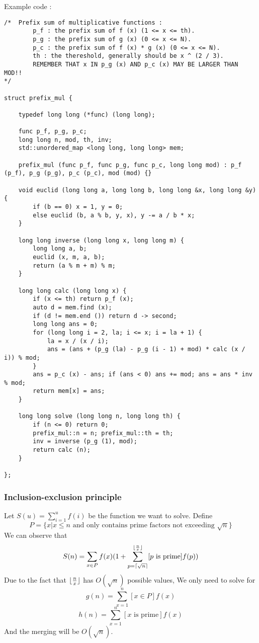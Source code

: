 Example code :

\begin{lstlisting}
/*	Prefix sum of multiplicative functions :
		p_f : the prefix sum of f (x) (1 <= x <= th).
		p_g : the prefix sum of g (x) (0 <= x <= N).
		p_c : the prefix sum of f (x) * g (x) (0 <= x <= N).
		th : the thereshold, generally should be x ^ (2 / 3).
		REMEMBER THAT x IN p_g (x) AND p_c (x) MAY BE LARGER THAN MOD!!
*/

struct prefix_mul {

	typedef long long (*func) (long long);

	func p_f, p_g, p_c;
	long long n, mod, th, inv;
	std::unordered_map <long long, long long> mem;

	prefix_mul (func p_f, func p_g, func p_c, long long mod) : p_f (p_f), p_g (p_g), p_c (p_c), mod (mod) {}

	void euclid (long long a, long long b, long long &x, long long &y) {
		if (b == 0) x = 1, y = 0;
		else euclid (b, a % b, y, x), y -= a / b * x;
	}

	long long inverse (long long x, long long m) {
		long long a, b;
		euclid (x, m, a, b);
		return (a % m + m) % m;
	}

	long long calc (long long x) {
		if (x <= th) return p_f (x);
		auto d = mem.find (x);
		if (d != mem.end ()) return d -> second;
		long long ans = 0;
		for (long long i = 2, la; i <= x; i = la + 1) {
			la = x / (x / i);
			ans = (ans + (p_g (la) - p_g (i - 1) + mod) * calc (x / i)) % mod;
		}
		ans = p_c (x) - ans; if (ans < 0) ans += mod; ans = ans * inv % mod;
		return mem[x] = ans;
	}

	long long solve (long long n, long long th) {
		if (n <= 0) return 0;
		prefix_mul::n = n; prefix_mul::th = th;
		inv = inverse (p_g (1), mod);
		return calc (n); 
	}

};
\end{lstlisting}

\subsubsection{Inclusion-exclusion principle}

Let $S(u)=\sum_{i=1}^uf(i)$ be the function we want to solve. Define
$$P = \{x|x \leq n \text{ and only contains prime factors not exceeding } \sqrt{n}\}$$
We can observe that $$S(n)=\sum_{x \in P} f(x)(1 + \sum_{p=\lceil\sqrt{n}\rceil}^{\lfloor\frac{n}{x}\rfloor}[p \text{ is prime}]f(p))$$
Due to the fact that $\lfloor\frac{n}{x}\rfloor$ has $O(\sqrt{n})$ possible values, We only need to solve for
$$g(n)=\sum_{x=1}^{n}[x \in P]f(x)$$
$$h(n)=\sum_{x=1}^{n}[x \text{ is prime}]f(x)$$
And the merging will be $O(\sqrt{n})$.

